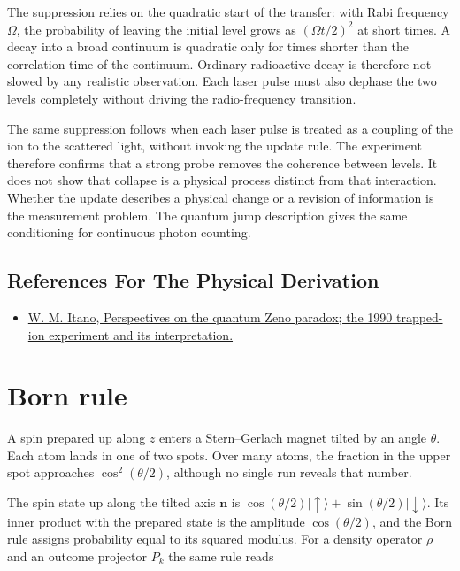 \documentclass[11pt,oneside]{book}
\begin{document}
The suppression relies on the quadratic start of the transfer: with Rabi frequency \(\Omega\), the probability of leaving the initial level grows as \((\Omega t/2)^2\) at short times. A decay into a broad continuum is quadratic only for times shorter than the correlation time of the continuum. Ordinary radioactive decay is therefore not slowed by any realistic observation. Each laser pulse must also dephase the two levels completely without driving the radio-frequency transition.

The same suppression follows when each laser pulse is treated as a coupling of the ion to the scattered light, without invoking the update rule. The experiment therefore confirms that a strong probe removes the coherence between levels. It does not show that collapse is a physical process distinct from that interaction. Whether the update describes a physical change or a revision of information is the measurement problem. The quantum jump description gives the same conditioning for continuous photon counting.

\subsection*{References For The Physical Derivation}
\begin{itemize}
\item \href{https://arxiv.org/abs/quant-ph/0612187}{W. M. Itano, Perspectives on the quantum Zeno paradox; the 1990 trapped-ion experiment and its interpretation.}
\end{itemize}





\clearpage

\section{Born rule}

\label{topic:born-rule}

A spin prepared up along \(z\) enters a Stern--Gerlach magnet tilted by an angle \(\theta\). Each atom lands in one of two spots. Over many atoms, the fraction in the upper spot approaches \(\cos^2(\theta/2)\), although no single run reveals that number.

The spin state up along the tilted axis \(\mathbf n\) is \(\cos(\theta/2)|{\uparrow}\rangle+\sin(\theta/2)|{\downarrow}\rangle\). Its inner product with the prepared state is the amplitude \(\cos(\theta/2)\), and the Born rule assigns probability equal to its squared modulus. For a density operator \(\rho\) and an outcome projector \(P_k\) the same rule reads
\end{document}
